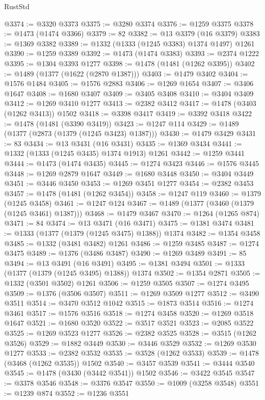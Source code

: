 \begin{lexlean}{RustStd}
\begin{coremodule}
@3374 := @3320 @3373
@3375 := @3280 @3374
@3376 := @1259 @3375
@3378 := @1473 (@1474 @3366)
@3379 := 82
@3382 := @13 @3379 (@16 @3379)
@3383 := @1369 @3382
@3389 := @1332 (@1333 (@1245 @3383) @1374 @1497) @1261
@3390 := @1259 @3389
@3392 := @1473 (@1474 @3383)
@3393 := @2374 @1222
@3395 := @1304 @3393 @1277
@3398 := @1478 (@1481 (@1262 @3395))
@3402 := @1489 (@1377 (@1622 (@2870 @1387)))
@3403 := @1479 @3402
@3404 := @1576 @1484
@3405 := @1576 @2883
@3406 := @1269 @1654
@3407 := @3406 @1647
@3408 := @1680 @3407
@3409 := @3405 @3408
@3410 := @3404 @3409
@3412 := @1269 @3410 @1277
@3413 := @2382 @3412
@3417 := @1478 (@3403 (@1262 @3413)) @1502
@3418 := @3398 @3417
@3419 := @3392 @3418
@3422 := @1478 (@1481 (@3390 @3419))
@3423 := @1247 @114
@3429 := @1489 (@1377 (@2873 (@1379 (@1245 @3423) @1387)))
@3430 := @1479 @3429
@3431 := 83
@3434 := @13 @3431 (@16 @3431)
@3435 := @1369 @3434
@3441 := @1332 (@1333 (@1245 @3435) @1374 @1913) @1261
@3442 := @1259 @3441
@3444 := @1473 (@1474 @3435)
@3445 := @1274 @3423
@3446 := @1576 @3445
@3448 := @1269 @2879 @1647
@3449 := @1680 @3448
@3450 := @3404 @3449
@3451 := @3446 @3450
@3453 := @1269 @3451 @1277
@3454 := @2382 @3453
@3457 := @1478 (@1481 (@1262 @3454))
@3458 := @1247 @119
@3460 := @1379 (@1245 @3458)
@3461 := @1247 @124
@3467 := @1489 (@1377 (@3460 (@1379 (@1245 @3461) @1387)))
@3468 := @1479 @3467
@3470 := @1264 (@1265 @874)
@3471 := 84
@3474 := @13 @3471 (@16 @3471)
@3475 := @1381 @3474
@3481 := @1333 (@1377 (@1379 (@1245 @3475) @1388)) @1374
@3482 := @1354 @3458
@3485 := @1332 (@3481 @3482) @1261
@3486 := @1259 @3485
@3487 := @1274 @3475
@3489 := @1376 (@3486 @3487)
@3490 := @1269 @3489
@3491 := 85
@3494 := @13 @3491 (@16 @3491)
@3495 := @1381 @3494
@3501 := @1333 (@1377 (@1379 (@1245 @3495) @1388)) @1374
@3502 := @1354 @2871
@3505 := @1332 (@3501 @3502) @1261
@3506 := @1259 @3505
@3507 := @1274 @3495
@3509 := @1376 (@3506 @3507)
@3511 := @1269 @3509 @1277
@3512 := @3490 @3511
@3514 := @3470 @3512 @1042
@3515 := @1873 @3514
@3516 := @1274 @3461
@3517 := @1576 @3516
@3518 := @1274 @3458
@3520 := @1269 @3518 @1647
@3521 := @1680 @3520
@3522 := @3517 @3521
@3523 := @2085 @3522
@3525 := @1269 @3523 @1277
@3526 := @2382 @3525
@3528 := @3515 (@1262 @3526)
@3529 := @1882 @3449
@3530 := @3446 @3529
@3532 := @1269 @3530 @1277
@3533 := @2382 @3532
@3535 := @3528 (@1262 @3533)
@3539 := @1478 (@3468 (@1262 @3535)) @1502
@3540 := @3457 @3539
@3541 := @3444 @3540
@3545 := @1478 (@3430 (@3442 @3541)) @1502
@3546 := @3422 @3545
@3547 := @3378 @3546
@3548 := @3376 @3547
@3550 := @1009 (@3258 @3548)
@3551 := @1239 @874
@3552 := @1236 @3551

\end{coremodule}
\end{lexlean}

